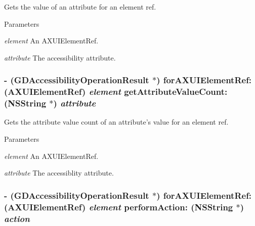 Gets the value of an attribute for an element ref. 
\begin{DoxyParams}{Parameters}
\item[{\em element}]An AXUIElementRef. \item[{\em attribute}]The accessibility attribute. \end{DoxyParams}
\hypertarget{interface_g_d_accessibility_manager_a043c9bc6dd9c456ccf038eef0c765dcd}{
\subsubsection[{forAXUIElementRef:getAttributeValueCount:}]{\setlength{\rightskip}{0pt plus 5cm}-\/ ({\bf GDAccessibilityOperationResult} $\ast$) forAXUIElementRef: (AXUIElementRef) {\em element}\/ getAttributeValueCount: (NSString $\ast$) {\em attribute}}}
\label{interface_g_d_accessibility_manager_a043c9bc6dd9c456ccf038eef0c765dcd}


Gets the attribute value count of an attribute's value for an element ref. 
\begin{DoxyParams}{Parameters}
\item[{\em element}]An AXUIElementRef. \item[{\em attribute}]The accessiblity attribute. \end{DoxyParams}
\hypertarget{interface_g_d_accessibility_manager_a365dbd94f222b04c86141c83c1542e68}{
\subsubsection[{forAXUIElementRef:performAction:}]{\setlength{\rightskip}{0pt plus 5cm}-\/ ({\bf GDAccessibilityOperationResult} $\ast$) forAXUIElementRef: (AXUIElementRef) {\em element}\/ performAction: (NSString $\ast$) {\em action}}}
\label{interface_g_d_accessibility_manager_a365dbd94f222b04c86141c83c1542e68}


